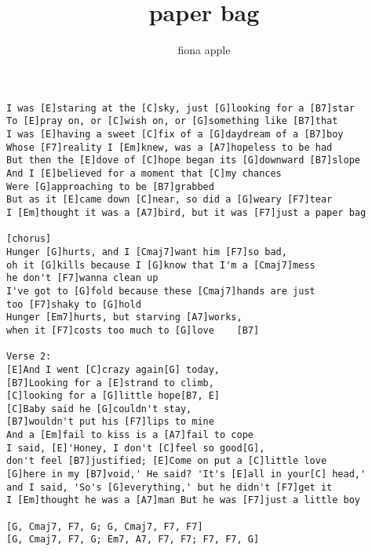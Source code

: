 \author{fiona apple}
\title{paper bag}
\maketitle
\begin{verbatim}
I was [E]staring at the [C]sky, just [G]looking for a [B7]star
To [E]pray on, or [C]wish on, or [G]something like [B7]that
I was [E]having a sweet [C]fix of a [G]daydream of a [B7]boy
Whose [F7]reality I [Em]knew, was a [A7]hopeless to be had
But then the [E]dove of [C]hope began its [G]downward [B7]slope
And I [E]believed for a moment that [C]my chances
Were [G]approaching to be [B7]grabbed
But as it [E]came down [C]near, so did a [G]weary [F7]tear
I [Em]thought it was a [A7]bird, but it was [F7]just a paper bag

[chorus]
Hunger [G]hurts, and I [Cmaj7]want him [F7]so bad,
oh it [G]kills because I [G]know that I'm a [Cmaj7]mess
he don't [F7]wanna clean up
I've got to [G]fold because these [Cmaj7]hands are just
too [F7]shaky to [G]hold
Hunger [Em7]hurts, but starving [A7]works,
when it [F7]costs too much to [G]love    [B7]

Verse 2:
[E]And I went [C]crazy again[G] today,
[B7]Looking for a [E]strand to climb,
[C]looking for a [G]little hope[B7, E]
[C]Baby said he [G]couldn't stay,
[B7]wouldn't put his [F7]lips to mine
And a [Em]fail to kiss is a [A7]fail to cope
I said, [E]'Honey, I don't [C]feel so good[G],
don't feel [B7]justified; [E]Come on put a [C]little love
[G]here in my [B7]void,' He said? 'It's [E]all in your[C] head,' 
and I said, 'So's [G]everything,' but he didn't [F7]get it 
I [Em]thought he was a [A7]man But he was [F7]just a little boy

[G, Cmaj7, F7, G; G, Cmaj7, F7, F7]
[G, Cmaj7, F7, G; Em7, A7, F7, F7; F7, F7, G]
\end{verbatim}